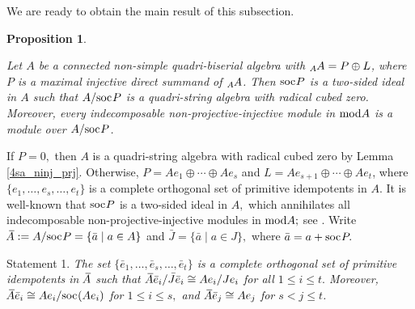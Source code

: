 \documentclass[10pt]{amsart}
\newtheorem{Prop}[Theo]{Proposition}
\theoremstyle{definition}
\newcommand{\mmod}{{\rm mod}}
\newcommand{\soc}{{\rm soc}\hspace{.5pt}}
\newcommand{\vp}{\vspace{.5pt}}
\begin{document}
We are ready to obtain the main result of this subsection.

\begin{Prop}\label{4ba-4sa}

Let $A$ be a connected non-simple quadri-biserial algebra with ${}_A\hspace{-.5pt}A=P\oplus L$, \vspace{-.5pt} where $P$ is a maximal injective direct summand of ${}_A\hspace{-.5pt}A$. Then $\soc P$ is a two-sided ideal in $A$ such that $A/\soc P$ is a quadri-string algebra with radical cubed zero. Moreover, every indecomposable non-projective-injective module in $\mmod A$ is a module over $A/\soc P$.


\end{Prop}

\vspace{-1.5pt}

 If $P=0,$ then $A$ is a quadri-string algebra with radical cubed zero by Lemma \ref{4sa_ninj_prj}. Otherwise, $P=Ae_1\oplus \cdots\oplus Ae_s$ and $L=Ae_{s+1}\oplus \cdots \oplus Ae_t$, where $\{e_1, \ldots, e_s,\ldots, e_t\}$ is a complete orthogonal set of primitive idempotents in $A$. It is well-known that $\soc P$ is a two-sided ideal in $A,$ which annihilates all indecomposable non-projective-injective modules in $\mmod A;$ see \cite[(4.2)]{AuR}. Write 
$\hspace{2pt}\overline{\hspace{-2.8pt}A}:=A/\soc P=\{\bar a \mid a\in A\}$ and $\bar J=\{\bar a \mid a\in J\},$ where $\bar a=a+\soc P.$

\vspace{.5pt}

{\sc Statement 1.} {\it The set \vp $\{\bar e_1, \ldots, \bar e_s, \ldots, \bar e_t\}$ is a complete orthogonal set of primitive idempotents in $\hspace{2pt}\overline{\hspace{-2.8pt}A}$ such that $\hspace{2pt}\overline{\hspace{-2.5pt}A} \bar e_i / \bar J \bar e_i \cong Ae_i/Je_i$ for all $1\le i\le t.$ Moreover, $\hspace{2pt}\overline{\hspace{-2.5pt}A} \bar e_i \cong Ae_i/\soc(Ae_i)$ for $1\le i\le s,$ and $\hspace{2pt}\overline{\hspace{-2.5pt}A} \bar e_j \cong Ae_j$ for $s<j\le t$.}
\end{document}
